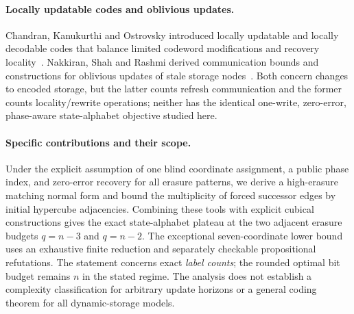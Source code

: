 \paragraph{Locally updatable codes and oblivious updates.}
Chandran, Kanukurthi and Ostrovsky introduced locally updatable and
locally decodable codes that balance limited codeword modifications and
recovery locality~\cite{chandran2014}. Nakkiran, Shah and Rashmi derived
communication bounds and constructions for oblivious updates of stale
storage nodes~\cite{nakkiran2014}. Both concern changes to encoded
storage, but the latter counts refresh communication and the former
counts locality/rewrite operations; neither has the identical one-write,
zero-error, phase-aware state-alphabet objective studied here.

\paragraph{Specific contributions and their scope.}
Under the explicit assumption of one blind coordinate assignment, a
public phase index, and zero-error recovery for all erasure patterns,
we derive a high-erasure matching normal form and bound the multiplicity
of forced successor edges by initial hypercube adjacencies. Combining
these tools with explicit cubical constructions gives the exact
state-alphabet plateau at the two adjacent erasure budgets $q=n-3$
and $q=n-2$. The exceptional seven-coordinate lower bound uses an
exhaustive finite reduction and separately checkable propositional
refutations. The statement concerns exact \emph{label counts}; the rounded
optimal bit budget remains $n$ in the stated regime. The analysis does
not establish a complexity classification for arbitrary update horizons
or a general coding theorem for all dynamic-storage models.
